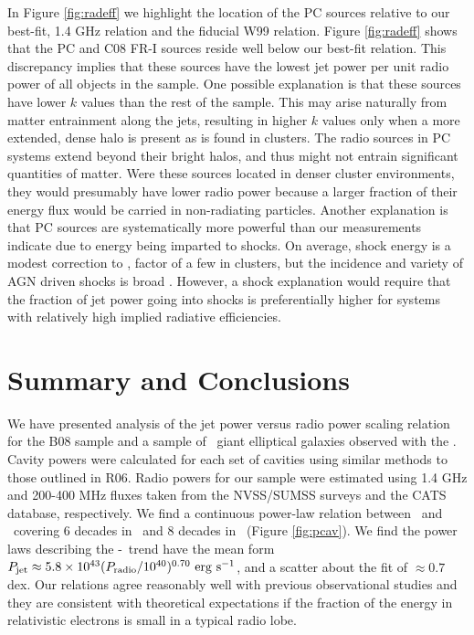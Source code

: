 \documentclass[12pt, preprint]{aastex}
\begin{document}
In Figure \ref{fig:radeff} we highlight the location of the PC sources
relative to our best-fit, 1.4 GHz relation and the fiducial W99
relation. Figure \ref{fig:radeff} shows that the PC and C08 FR-I
sources reside well below our best-fit relation. This discrepancy
implies that these sources have the lowest jet power per unit radio
power of all objects in the sample. One possible explanation is that
these sources have lower $k$ values than the rest of the sample. This
may arise naturally from matter entrainment along the jets, resulting
in higher $k$ values only when a more extended, dense halo is present
as is found in clusters. The radio sources in PC systems extend beyond
their bright halos, and thus might not entrain significant quantities
of matter. Were these sources located in denser cluster environments,
they would presumably have lower radio power because a larger fraction
of their energy flux would be carried in non-radiating
particles. Another explanation is that PC sources are systematically
more powerful than our measurements indicate due to energy being
imparted to shocks. On average, shock energy is a modest correction to
\pcav, factor of a few in clusters, but the incidence and variety of
AGN driven shocks is broad \citep[\eg][]{2003ApJ...592..129K,
  hydraa}. However, a shock explanation would require that the
fraction of jet power going into shocks is preferentially higher for
systems with relatively high implied radiative efficiencies.

\section{Summary and Conclusions}
\label{sec:summary}

We have presented analysis of the jet power versus radio power scaling
relation for the B08 sample and a sample of \samp\ giant elliptical
galaxies observed with the \cxo. Cavity powers were calculated for
each set of cavities using similar methods to those outlined in
R06. Radio powers for our sample were estimated using 1.4 GHz and
200-400 MHz fluxes taken from the NVSS/SUMSS surveys and the CATS
database, respectively. We find a continuous power-law relation
between \pjet\ and \prad\ covering 6 decades in \prad\ and 8 decades
in \pjet\ (Figure \ref{fig:pcav}). We find the power laws describing
the \pjet-\prad\ trend have the mean form $P_{\rm{jet}} \approx 5.8 \times
10^{43} (P_{\rm{radio}}/10^{40})^{0.70} ~\rm{\mbox{\ensuremath{\rm{erg}}}~\ensuremath{\rm{\mbox{\ensuremath{\rm{s}}}^{-1}}}}$, and a scatter about the fit of
$\approx 0.7$ dex. Our relations agree reasonably well with previous
observational studies and they are consistent with theoretical
expectations if the fraction of the energy in relativistic electrons
is small in a typical radio lobe.
\end{document}
